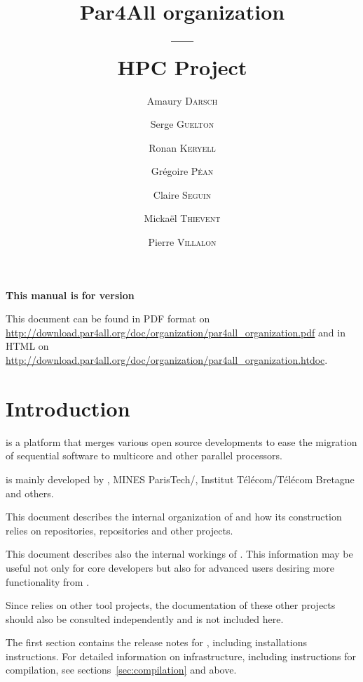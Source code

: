 \documentclass[a4paper]{article}
\newcommand{\LINK}[1]{\url{#1}\xspace}
\newcommand{\PfaOrganizationPDF}{\LINK{http://download.par4all.org/doc/organization/par4all_organization.pdf}}
\newcommand{\PfaAllOrganizationHTDOC}{\LINK{http://download.par4all.org/doc/organization/par4all_organization.htdoc}}
\begin{document}
\title{Par4All organization\\
  ---\\
  HPC Project}

\author{Amaury \textsc{Darsch} \and Serge \textsc{Guelton} \and Ronan
  \textsc{Keryell} \and Grégoire \textsc{Péan} \and Claire \textsc{Seguin}
  \and Mickaël \textsc{Thievent} \and Pierre \textsc{Villalon}}

\maketitle

\noindent\textbf{This manual is for \Apfa version }
\bigskip

This document can be found in PDF format on \PfaOrganizationPDF and in HTML
on \PfaAllOrganizationHTDOC.


\section{Introduction}
\label{sec:introduction}

\Apfa is a platform that merges various open source developments to ease
the migration of sequential software to multicore and other parallel
processors.

\Apfa is mainly developed by \Ahpcp, MINES ParisTech/\Acri, Institut
Télécom/Télécom Bretagne and others.

This document describes the internal organization of \Apfa and how its
construction relies on \Agit repositories, \Asvn repositories and other
projects.

This document describes also the internal workings of \Apfa.
This information may be useful not only for \Apfa core developers but
also for advanced users desiring more functionality from \Apfa.

Since \Apfa relies on other tool projects, the documentation of these other
projects should also be consulted independently and is not included here.

The first section contains the release notes for \Apfa, including
installations instructions. For detailed information on \Apfa
infrastructure, including instructions for compilation, see
sections~\ref{sec:compilation} and above.

\tableofcontents{}
\end{document}
